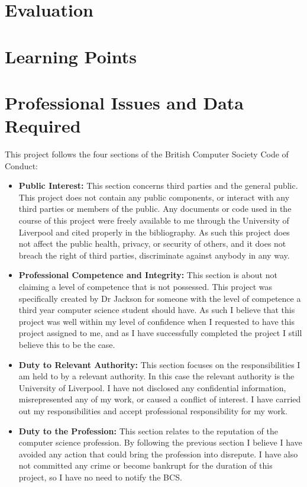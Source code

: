 \documentclass{article}
\begin{document}
    \section{Evaluation}

    \section{Learning Points}

    \section{Professional Issues and Data Required}
    
    	This project follows the four sections of the British Computer Society Code of Conduct:
    	
    	\begin{itemize}
    		\item \textbf{Public Interest:} This section concerns third parties and the general public. This project does not contain any public components, or interact with any third parties or members of the public. Any documents or code used in the course of this project were freely available to me through the University of Liverpool and cited properly in the bibliography. As such this project does not affect  the public health, privacy, or security of others, and it does not breach the right of third parties, discriminate against anybody in any way.
    		
    		\item \textbf{Professional Competence and Integrity:} This section is about not claiming a level of competence that is not possessed. This project was specifically created by Dr Jackson for someone with the level of competence a third year computer science student should have. As such I believe that this project was well within my level of confidence when I requested to have this project assigned to me, and as I have successfully completed the project I still believe this to be the case.
    		
    		\item \textbf{Duty to Relevant Authority:} This section focuses on the responsibilities I am held to by a relevant authority. In this case the relevant authority is the University of Liverpool. I have not disclosed any confidential information, misrepresented any of my work, or caused a conflict of interest. I have carried out my responsibilities and accept professional responsibility for my work.
    		
    		\item \textbf{Duty to the Profession:} This section relates to the reputation of the computer science profession. By following the previous section I believe I have avoided any action that could bring the profession into disrepute. I have also not committed any crime or become bankrupt for the duration of this project, so I have no need to notify the BCS.
    	\end{itemize}
    
\end{document}
